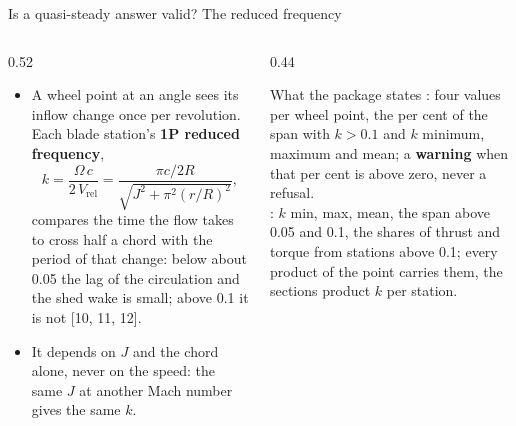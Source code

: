 \begin{frame}{Is a quasi-steady answer valid? The reduced frequency}
\begin{columns}[T]
\begin{column}{0.52\textwidth}
\begin{itemize}\small
  \item A wheel point at an angle sees its inflow change once per
        revolution. Each blade station's \textbf{1P reduced frequency},
        \[ k = \frac{\Omega\,c}{2\,V_\mathrm{rel}}
             = \frac{\pi c / 2R}{\sqrt{J^2 + \pi^2 (r/R)^2}}, \]
        compares the time the flow takes to cross half a chord with the
        period of that change: below about 0.05 the lag of the circulation
        and the shed wake is small; above 0.1 it is not [10, 11, 12].
  \item It depends on \(J\) and the chord alone, never on the speed: the
        same \(J\) at another Mach number gives the same \(k\).
\end{itemize}
\end{column}
\begin{column}{0.44\textwidth}
\begin{block}{What the package states}
\small {}: four values per wheel point, the per cent of the span
with \(k > 0.1\) and \(k\) minimum, maximum and mean; a \textbf{warning} when
that per cent is above zero, never a refusal.\\[1mm]
: \(k\) min, max, mean, the span above 0.05 and
0.1, the shares of thrust and torque from stations above 0.1; every product
of the point carries them, the sections product \(k\) per station.
\end{block}
\end{column}
\end{columns}
\end{frame}

